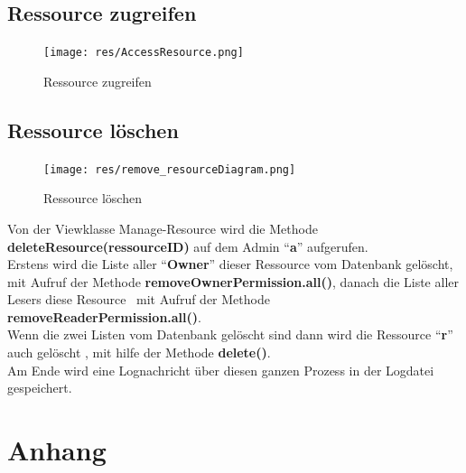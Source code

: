 \documentclass[parskip=full,11pt]{scrartcl}
\begin{document}
    \newpage
 \subsection{Ressource zugreifen}
 \begin{figure}[ht!]
 	\centering
 	\texttt{[image: res/AccessResource.png]}
 	\caption{Ressource zugreifen}
 \end{figure}
 \newpage
 
 \subsection{Ressource löschen}
 \begin{figure}[ht!]
 	\centering
 	\texttt{[image: res/remove\_resourceDiagram.png]}
 	\caption{Ressource löschen}
 \end{figure}
 
 
 Von der Viewklasse Manage-Resource wird die Methode \textbf{deleteResource(ressourceID)} auf dem Admin \enquote{\textbf{a}}  aufgerufen.\\ Erstens wird die Liste aller \enquote{\textbf{Owner}} dieser Ressource vom Datenbank gelöscht, mit Aufruf der Methode \textbf{removeOwnerPermission.all()}, danach die Liste aller Lesers diese Resource \ mit Aufruf der Methode \textbf{removeReaderPermission.all()}.\\
 Wenn die zwei Listen vom Datenbank gelöscht sind dann wird die Ressource \enquote{\textbf{r}} auch gelöscht , mit hilfe der Methode \textbf{delete()}.\\ Am Ende wird eine Lognachricht über diesen ganzen Prozess  in der Logdatei gespeichert.\\
 
 \newpage
 \section{Anhang}
 \newpage
{}
\printglossary	
	
 
\end{document}
